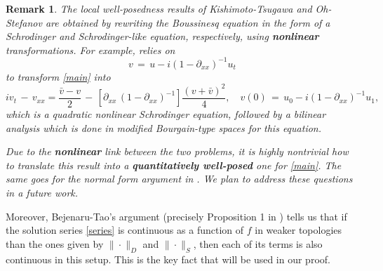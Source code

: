 \documentclass{amsart}
\newtheorem{remark}[theorem]{Remark}
\begin{document}
\begin{remark}
The local well-posedness results of Kishimoto-Tsugawa \cite{KT10} and Oh-Stefanov \cite{OS12} are obtained by rewriting the Boussinesq equation in the form of a Schrodinger and Schrodinger-like equation, respectively, using \textbf{nonlinear} transformations. For example, \cite{KT10} relies on
\[
v\,=\,u - i(1 - \partial_{xx})^{-1} u_t\]
to transform \eqref{main} into
\[
 i v_{t} \,-\, v_{xx} = \frac{\bar{v}-v}{2}\, -
\,\left[\partial_{xx}\,(1 - \partial_{xx})^{-1}\right] \frac{(v + \bar{v})^{2}}{4}, \quad v(0)\,=\,u_0 - i(1 - \partial_{xx})^{-1} u_1,
\]
which is a quadratic nonlinear Schrodinger equation, followed by a bilinear analysis which is done in modified Bourgain-type spaces for this equation. 

Due to the \textbf{nonlinear} link between the two problems, it is highly nontrivial how to translate this result into a \textbf{quantitatively well-posed} one for \eqref{main}. The same goes for the normal form argument in  \cite{OS12}. We plan to address these questions in a future work.
\label{sw}
\end{remark}

Moreover, Bejenaru-Tao's argument (precisely Proposition 1 in \cite{BT06}) tells us that if the solution series \eqref{series} is continuous as a function of $f$ in  weaker topologies than the ones given by $\| \cdot\|_D$ and $\| \cdot \|_S$, then each of its terms is also continuous in this setup. This is the key fact  that will be used in our proof.
\end{document}
